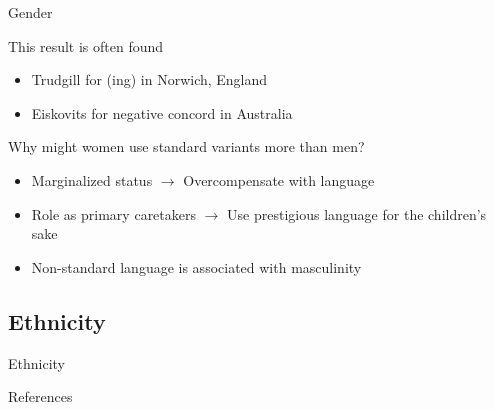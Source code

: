\documentclass{beamer}
\newcommand{\subonefour}{Gender}
\newcommand{\subonefive}{Ethnicity}
\begin{document}
      \begin{frame}{\subonefour}
        \begin{block}{This result is often found}
          \begin{itemize}
            \item Trudgill for (ing) in Norwich, England %
            \item Eiskovits for negative concord in Australia %
          \end{itemize}
        \end{block}
        \begin{block}{Why might women use standard variants more than men?}
          \begin{itemize}
            \item<2-> Marginalized status $\rightarrow$ Overcompensate with language
            \item<2-> Role as primary caretakers $\rightarrow$ Use prestigious language for the children's sake
            \item<2-> Non-standard language is associated with masculinity
          \end{itemize}
        \end{block}
      \end{frame}

    \subsection{\subonefive}
      \begin{frame}{\subonefive}
        \begin{definition}
          
        \end{definition}
      \end{frame}

      \begin{frame}{References}
      \end{frame}
\end{document}
